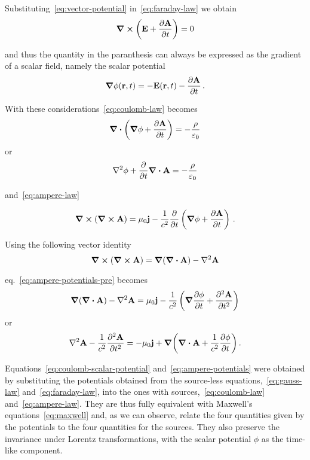 \documentclass[12pt, class=report, crop=false]{standalone}
\begin{document}
Substituting~\eqref{eq:vector-potential} in~\eqref{eq:faraday-law} we obtain
\begin{equation}
  \label{eq:faraday-vector-potential}
  \curl(\vb{E} + \pdv{\vb{A}}{t}) = 0
\end{equation}

and thus the quantity in the paranthesis can always be expressed as the
gradient of a scalar field, namely the scalar potential
\[
\grad{\phi}(\vb{r}, t) = -\vb{E}(\vb{r}, t) - \pdv{\vb{A}}{t}\,.
\]

With these considerations~\eqref{eq:coulomb-law} becomes
\[
  \div(\grad{\phi} + \pdv{\vb{A}}{t}) = - \frac{\rho}{\varepsilon_0}
\]
or
\begin{equation}
  \label{eq:coulomb-scalar-potential}
  \laplacian{\phi} + \pdv{t}\div{\vb{A}} = - \frac{\rho}{\varepsilon_0}
\end{equation}

and~\eqref{eq:ampere-law}

\begin{equation}
  \label{eq:ampere-potentials-pre}
  \curl(\curl{\vb{A}}) = \mu_0 \vb{j}
    - \frac{1}{c^2} \pdv{t} \left( \grad{\phi} + \pdv{\vb{A}}{t} \right)\,.
\end{equation}

Using the following vector identity
\begin{equation}
  \label{eq:curl-of-curl}
  \curl(\curl{\vb{A}}) = \grad(\div{\vb{A}}) - \laplacian{\vb{A}}
\end{equation}

eq.~\eqref{eq:ampere-potentials-pre} becomes
\[
  \grad(\div{\vb{A}}) - \laplacian{\vb{A}} = \mu_0 \vb{j}
    - \frac{1}{c^2} \left( \grad{\pdv{\phi}{t}} + \pdv[2]{\vb{A}}{t} \right)
\]
or
\begin{equation}
  \label{eq:ampere-potentials}
  \laplacian{\vb{A}} - \frac{1}{c^2}\pdv[2]{\vb{A}}{t} =
    -\mu_0 \vb{j} + \grad(\div{\vb{A}} + \frac{1}{c^2} \pdv{\phi}{t})\,.
\end{equation}

Equations~\eqref{eq:coulomb-scalar-potential} and~\eqref{eq:ampere-potentials}
were obtained by substituting the potentials obtained from the source-less
equations,~\eqref{eq:gauss-law} and~\eqref{eq:faraday-law}, into the ones
with sources,~\eqref{eq:coulomb-law} and~\eqref{eq:ampere-law}. They are thus
fully equivalent with Maxwell's equations~\eqref{eq:maxwell} and, as we can observe,
relate the four quantities given by the potentials to the four quantities for the
sources. They also preserve the invariance under Lorentz transformations, with
the scalar potential \(\phi\) as the time-like component.
\end{document}
